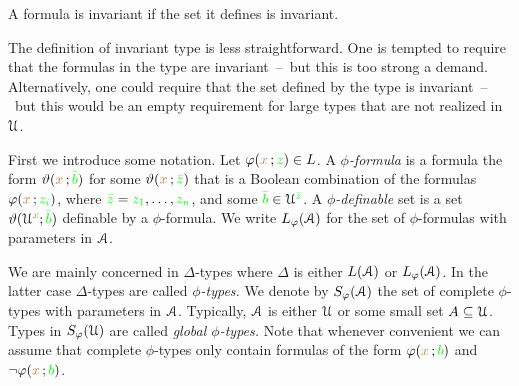 A formula is invariant if the set it defines is invariant.

The definition of invariant type is less straightforward.
One is tempted to require that the formulas in the type are invariant~--~but this is too strong a demand.
Alternatively, one could require that the set defined by the type is invariant~--~but this would be an empty requirement for large types that are not realized in $\EuScript U$.

First we introduce some notation.
Let $\varphi({\color{brown} x}\,;{\color{green} z})\in L$.
A \emph{$\phi$-formula\/} is a formula the form $\vartheta({\color{brown} x}\,;{\color{green}\bar b})$ for some $\vartheta({\color{brown} x}\,;{\color{green}\bar z})$ that is a Boolean combination of the formulas $\varphi({\color{brown} x}\,;{\color{green} z_i})$, where ${\color{green}\bar z}={\color{green} z_1},\dots,{\color{green} z_n}$, and some ${\color{green}\bar b}\in\EuScript U^{\color{green}\bar z}$.
A \emph{$\phi$-definable\/} set is a set  $\vartheta(\EuScript U^{\color{brown} x};{\color{green}\bar b})$ definable by a $\phi$-formula.
We write \emph{$L_\varphi(\EuScript A)$\/} for the set of $\phi$-formulas with parameters in $\EuScript A$.

We are mainly concerned in $\Delta$-types where $\Delta$ is either $L(\EuScript A)$ or $L_\varphi(\EuScript A)$.
In the latter case $\Delta$-types are called \emph{$\phi$-types.}
We denote by \emph{$S_\varphi(\EuScript A)$\/} the set of complete $\phi$-types with parameters in $\EuScript A$.
Typically, $\EuScript A$ is either $\EuScript U$ or some small set $A\subseteq\EuScript U$.
Types in \emph{$S_{\varphi}(\EuScript U)$\/} are called \emph{global $\phi$-types.}
Note that whenever convenient we can assume that complete $\phi$-types only contain formulas of the form $\varphi({\color{brown} x}\,;{\color{green} b})$ and $\neg\varphi({\color{brown} x}\,;{\color{green} b})$.
   

% 


